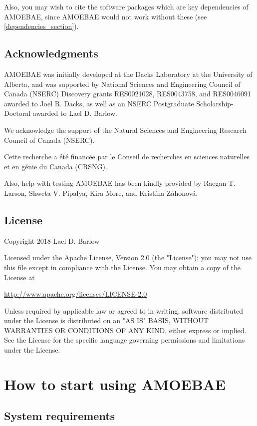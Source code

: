 \documentclass[12pt,letterpaper]{article}
\begin{document}
\begin{linenumbers}
Also, you may wish to cite the software packages which are key dependencies of
AMOEBAE, since AMOEBAE would not work without these (see
\autoref*{dependencies_section}).

\subsection{Acknowledgments}

AMOEBAE was initially developed at the Dacks Laboratory at the University of
Alberta, and was supported by National Sciences and Engineering Council of
Canada (NSERC) Discovery grants RES0021028, RES0043758, and RES0046091 awarded
to Joel B. Dacks, as well as an NSERC Postgraduate Scholarship-Doctoral awarded
to Lael D. Barlow.

We acknowledge the support of the Natural Sciences and Engineering Research Council of Canada (NSERC).

Cette recherche a \'et\'e financ\'ee par le Conseil de recherches en sciences naturelles et en g\'enie du Canada (CRSNG).

Also, help with testing AMOEBAE has been kindly provided by Raegan T. Larson,
Shweta V. Pipalya, Kira More, and Krist\'ina Z\'ahonov\'a.

\subsection{License}
\label{license_section}

Copyright 2018 Lael D. Barlow

Licensed under the Apache License, Version 2.0 (the "License"); you may not use this file except in compliance with the License. You may obtain a copy of the License at

\url{http://www.apache.org/licenses/LICENSE-2.0}

Unless required by applicable law or agreed to in writing, software distributed under the License is distributed on an "AS IS" BASIS, WITHOUT WARRANTIES OR CONDITIONS OF ANY KIND, either express or implied. See the License for the specific language governing permissions and limitations under the License.


\section{How to start using AMOEBAE}

\subsection{System requirements}


\end{linenumbers}
\end{document}
